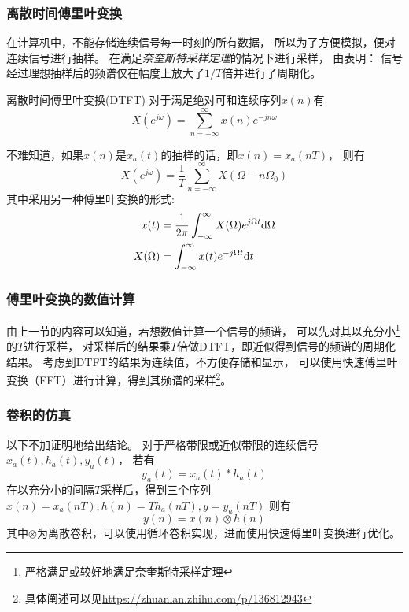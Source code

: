     \subsubsection{离散时间傅里叶变换}
        在计算机中，不能存储连续信号每一时刻的所有数据，
        所以为了方便模拟，便对连续信号进行抽样。
        在满足\emph{奈奎斯特采样定理}的情况下进行采样，
        由表明：
        信号经过理想抽样后的频谱仅在幅度上放大了$1/T$倍并进行了周期化。
        \begin{mydef}{离散时间傅里叶变换(DTFT)}
            对于满足绝对可和连续序列$x(n)$有
            \begin{equation}
                X(e^{j\omega})=\sum_{n=-\infty}^{\infty}x(n)e^{-jn\omega}
            \end{equation}
        \end{mydef}
        不难知道，如果$x(n)$是$x_a(t)$的抽样的话，即$x(n)=x_a(nT)$，
        则有
        \begin{equation*}
            X(e^{j\omega})=\frac{1}{T}\sum_{n=-\infty}^{\infty}X(\Omega-n\Omega_0)
        \end{equation*}
        其中采用另一种傅里叶变换的形式:
        \begin{equation}
            \begin{split}
                x(t)&=\frac{1}{2\pi}\int_{-\infty}^{\infty}X(\Omega)e^{j\Omega t}\text{\upshape d}\Omega\\
                X(\Omega)&=\int_{-\infty}^{\infty}x(t)e^{-j\Omega t}\text{\upshape d} t
            \end{split}
        \end{equation}

    \subsubsection{傅里叶变换的数值计算}
    由上一节的内容可以知道，若想数值计算一个信号的频谱，
    可以先对其以充分小\footnote{严格满足或较好地满足奈奎斯特采样定理}的$T$进行采样，
    对采样后的结果乘$T$倍做DTFT，即近似得到信号的频谱的周期化结果。
    考虑到DTFT的结果为连续值，不方便存储和显示，
    可以使用快速傅里叶变换（FFT）进行计算，得到其频谱的采样\footnote{具体阐述可以见\url{https://zhuanlan.zhihu.com/p/136812943}}。
    
    \subsubsection{卷积的仿真}
    以下不加证明地给出结论。
    对于严格带限或近似带限的连续信号$x_a(t),h_a(t),y_a(t)$，
    若有
    \begin{equation*}
        y_a(t)=x_a(t)*h_a(t)
    \end{equation*}
    在以充分小的间隔$T$采样后，得到三个序列
    $x(n)=x_a(nT),h(n)=Th_a(nT),y=y_a(nT)$
    则有
    \begin{equation*}
        y(n)=x(n)\otimes h(n)
    \end{equation*}
    其中$\otimes$为离散卷积，可以使用循环卷积实现，进而使用快速傅里叶变换进行优化。
